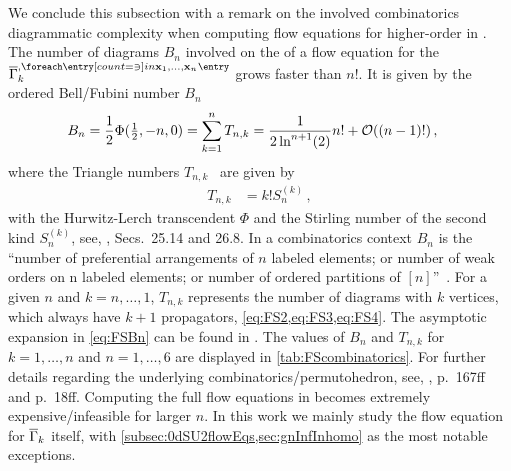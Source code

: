 \FloatBarrier%
We conclude this subsection with a remark on the involved combinatorics \dash{} diagrammatic complexity when computing flow equations for higher-order \nptFunctions{} in \fs{}.
The number of diagrams $B_n$ involved on the \rhs{} of a \frg{} flow equation for the \nptFunction{}  ${\protect\FSvertex{\protect\FSidx{x}_1,\ldots,\protect\FSidx{x}_n}}$ grows faster than $n!$.
It is given by the  ordered Bell/Fubini number $B_n$~\cite{OEIS:A000670}
\begin{align}
	B_n&= \frac{1}{2}\Phi(\tfrac{1}{2},-n,0) =\sum_{k=1}^{n}T_{n,k} = \frac{1}{2\ln^{n+1}(2)}n!+\mathcal{O}((n-1)!)\, ,\label{eq:FSBn}
\end{align}
where the Triangle numbers $T_{n,k}$~\cite{OEIS:A019538} are given by
\begin{align}
	T_{n,k}&=k! S_n^{(k)}\, ,\label{eq:FSTnk}
\end{align}
with the Hurwitz-Lerch transcendent $\Phi$ and the Stirling number of the second kind $S_n^{(k)}$, see, \eg{},  Secs.~25.14 and 26.8.
In a combinatorics context $B_n$ is the ``number of preferential arrangements of $n$ labeled elements; or number of weak orders on n labeled elements; or number of ordered partitions of $[n]$''~\cite{OEIS:A000670}.
For a given $n$ and $k=n,\ldots,1$, $T_{n,k}$ represents the number of diagrams with $k$ vertices, which always have $k+1$ propagators, \cf{} \cref{eq:FS2,eq:FS3,eq:FS4}.
The asymptotic expansion in \cref{eq:FSBn} can be found in .
The values of $B_n$ and $T_{n,k}$ for ${k=1,\ldots,n}$ and ${n=1,\ldots,6}$ are displayed in \cref{tab:FScombinatorics}. For further details regarding the underlying combinatorics/permutohedron, see, \eg{},  p.~167ff and  p.~18ff.
Computing the full flow equations in \fs{} becomes extremely expensive/infeasible for larger $n$.
In this work we mainly study the flow equation for $\FSvertex{}$ itself, with \cref{subsec:0dSU2flowEqs,sec:gnInfInhomo} as the most notable exceptions.
\clearpage

